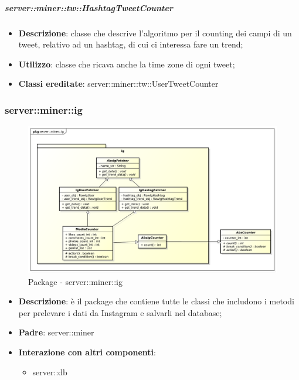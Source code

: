 	\subparagraph{server::miner::tw::HashtagTweetCounter} %
		\label{subp:server_miner_tw_HashtagTweetCounter}
			\begin{itemize}
				\item \textbf{Descrizione}: classe che descrive l'algoritmo per il counting dei campi di un tweet, relativo ad un hashtag, di cui ci interessa fare un trend;
				\item \textbf{Utilizzo}: classe che ricava anche la time zone di ogni tweet;
				\item \textbf{Classi ereditate}: server::miner::tw::UserTweetCounter
			\end{itemize}

\subsubsection{server::miner::ig} %
\label{ssub:bdsm_app_server_miner_ig}
\begin{figure}[htbp]
	\centering
	\centerline{\includegraphics[scale=0.4]{./images/server/miner_ig.pdf}}
	\caption{Package - server::miner::ig}
\end{figure}


\begin{itemize}
  \item \textbf{Descrizione}: è il package che contiene tutte le classi che includono i metodi per prelevare i dati da Instagram e salvarli nel database;
  \item \textbf{Padre}: server::miner
   \item \textbf{Interazione con altri componenti}:
  	\begin{itemize}
  		\item server::db
  	\end{itemize}
\end{itemize}

